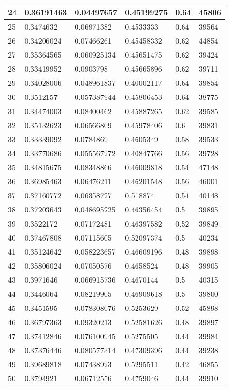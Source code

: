 \begin{longtable}{|l|l|l|l|l|l|}
24 & 0.36191463 & 0.04497657 & 0.45199275 & 0.64 & 45806 \\ \hline 
25 & 0.3474632 & 0.06971382 & 0.4533333 & 0.64 & 39564 \\ \hline 
26 & 0.34206024 & 0.07466261 & 0.45458332 & 0.62 & 44854 \\ \hline 
27 & 0.35364565 & 0.060925134 & 0.45651475 & 0.62 & 39424 \\ \hline 
28 & 0.33419952 & 0.0903798 & 0.45665896 & 0.62 & 39711 \\ \hline 
29 & 0.34028006 & 0.048961837 & 0.40002117 & 0.64 & 39854 \\ \hline 
30 & 0.3512157 & 0.057387944 & 0.45806453 & 0.64 & 38775 \\ \hline 
31 & 0.34474003 & 0.08400462 & 0.45887265 & 0.62 & 39585 \\ \hline 
32 & 0.35132623 & 0.06566809 & 0.45978406 & 0.6 & 39831 \\ \hline 
33 & 0.33339092 & 0.0784869 & 0.4605349 & 0.58 & 39533 \\ \hline 
34 & 0.33770686 & 0.055567272 & 0.40847766 & 0.56 & 39728 \\ \hline 
35 & 0.34815675 & 0.08348866 & 0.46009818 & 0.54 & 47148 \\ \hline 
36 & 0.36985463 & 0.06476211 & 0.46201548 & 0.56 & 46001 \\ \hline 
37 & 0.37160772 & 0.06358727 & 0.518874 & 0.54 & 40148 \\ \hline 
38 & 0.37203643 & 0.048695225 & 0.46356454 & 0.5 & 39895 \\ \hline 
39 & 0.3522172 & 0.07172481 & 0.46397582 & 0.52 & 39849 \\ \hline 
40 & 0.37467808 & 0.07115605 & 0.52097374 & 0.5 & 40234 \\ \hline 
41 & 0.35124642 & 0.058223657 & 0.46609196 & 0.48 & 39898 \\ \hline 
42 & 0.35806024 & 0.07050576 & 0.4658524 & 0.48 & 39905 \\ \hline 
43 & 0.3971646 & 0.066915736 & 0.4670144 & 0.5 & 40315 \\ \hline 
44 & 0.3446064 & 0.08219905 & 0.46909618 & 0.5 & 39800 \\ \hline 
45 & 0.3451595 & 0.078308076 & 0.5253629 & 0.52 & 45898 \\ \hline 
46 & 0.36797363 & 0.09320213 & 0.52581626 & 0.48 & 39897 \\ \hline 
47 & 0.37412846 & 0.076100945 & 0.5275505 & 0.44 & 39984 \\ \hline 
48 & 0.37376446 & 0.080577314 & 0.47309396 & 0.44 & 39238 \\ \hline 
49 & 0.39689818 & 0.07438923 & 0.5295511 & 0.42 & 46855 \\ \hline 
50 & 0.3794921 & 0.06712556 & 0.4759046 & 0.44 & 39910 \\ \hline 
\end{longtable}